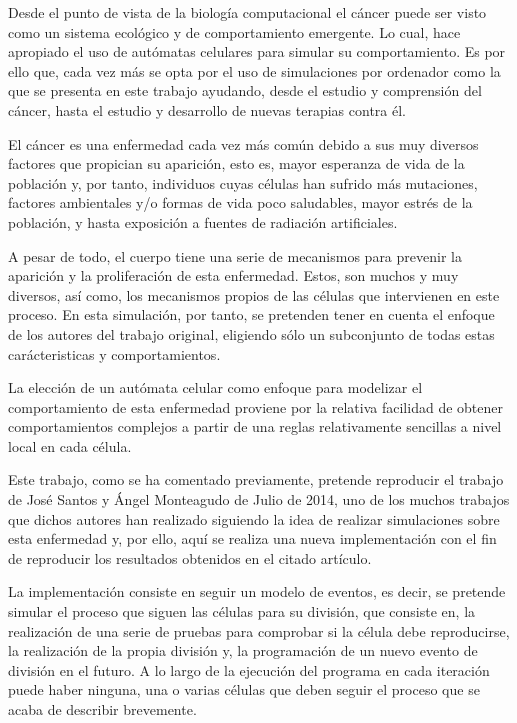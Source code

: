 Desde el punto de vista de la biología computacional el cáncer puede ser visto como un sistema ecológico y de comportamiento emergente.
Lo cual, hace apropiado el uso de autómatas celulares para simular su comportamiento. Es por ello que, cada vez más se opta por el uso
de simulaciones por ordenador como la que se presenta en este trabajo ayudando, desde el estudio y comprensión del cáncer, hasta
el estudio y desarrollo de nuevas terapias contra él.

El cáncer es una enfermedad cada vez más común debido a sus muy diversos factores que propician su aparición, esto es,
mayor esperanza de vida de la población y, por tanto, individuos cuyas células han sufrido más mutaciones, factores ambientales y/o
formas de vida poco saludables, mayor estrés de la población, y hasta exposición a fuentes de radiación artificiales.

A pesar de todo, el cuerpo tiene una serie de mecanismos para prevenir la aparición y la proliferación de esta enfermedad. Estos,
son muchos y muy diversos, así como, los mecanismos propios de las células que intervienen en este proceso. En esta simulación, por tanto,
se pretenden tener en cuenta el enfoque de los autores del trabajo original, eligiendo sólo un subconjunto de todas estas
carácteristicas y comportamientos.

La elección de un autómata celular como enfoque para modelizar el comportamiento de esta enfermedad proviene por la relativa
facilidad de obtener comportamientos complejos a partir de una reglas relativamente sencillas a nivel local en cada célula.

Este trabajo, como se ha comentado previamente, pretende reproducir el trabajo de José Santos y Ángel Monteagudo de Julio de 2014,
uno de los muchos trabajos que dichos autores han realizado siguiendo la idea de realizar simulaciones sobre esta enfermedad y, por ello, aquí
se realiza una nueva implementación con el fin de reproducir los resultados obtenidos en el citado artículo.

La implementación consiste en seguir un modelo de eventos, es decir, se pretende simular el proceso que siguen las células para su división, que
consiste en, la realización de una serie de pruebas para comprobar si la célula debe reproducirse, la realización de la propia división y,
la programación de un nuevo evento de división en el futuro. A lo largo de la ejecución del programa en cada iteración puede haber ninguna, una o
varias células que deben seguir el proceso que se acaba de describir brevemente.


